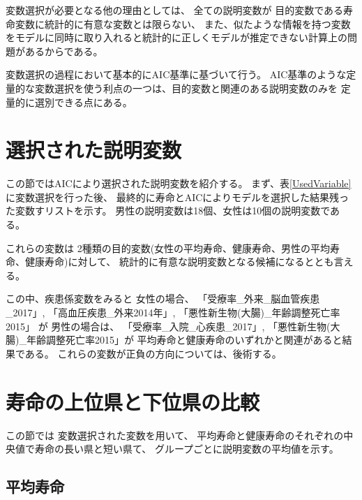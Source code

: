 \documentclass[a4j,11pt,mc]{jreport}
\newcommand{\tb}[1]{\textcolor{blue}{#1}} %
\begin{document}
変数選択が必要となる他の理由としては、
全ての説明変数が
目的変数である寿命変数に統計的に有意な変数とは限らない、
また、似たような情報を持つ変数をモデルに同時に取り入れると統計的に正しくモデルが推定できない計算上の問題があるからである。

変数選択の過程において基本的にAIC基準に基づいて行う。
AIC基準のような定量的な変数選択を使う利点の一つは、目的変数と関連のある説明変数のみを
定量的に選別できる点にある。


%
%
%


\section{選択された説明変数}

この節ではAICにより選択された説明変数を紹介する。
まず、表\ref{UsedVariable}に変数選択を行った後、
最終的に寿命とAICによりモデルを選択した結果残った変数すリストを示す。
男性の説明変数は18個、女性は10個の説明変数である。


これらの変数は
2種類の目的変数(女性の平均寿命、健康寿命、男性の平均寿命、健康寿命)に対して、
統計的に有意な説明変数となる候補になるととも言える。



この中、疾患係変数をみると
女性の場合、
「受療率\_外来\_脳血管疾患\_2017」,
「高血圧疾患\_外来2014年」,
「悪性新生物(大腸)\_年齢調整死亡率2015」
が
男性の場合は、
「受療率\_入院\_心疾患\_2017」,
「悪性新生物(大腸)\_年齢調整死亡率2015」が
平均寿命と健康寿命のいずれかと関連があると結果である。
これらの変数が正負の方向については、後術する。





\section{寿命の上位県と下位県の比較}
この節では
変数選択された変数を用いて、
平均寿命と健康寿命のそれぞれの中央値で寿命の長い県と短い県て、
グループごとに説明変数の平均値を示す。


\subsection{平均寿命}
\end{document}
